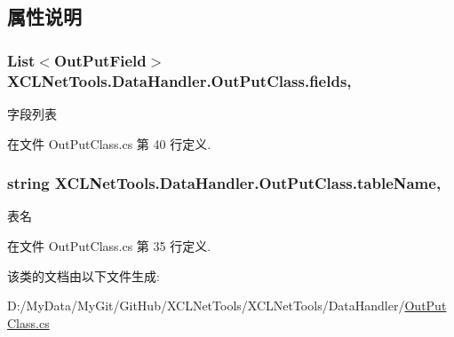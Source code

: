 \subsection{属性说明}
\hypertarget{class_x_c_l_net_tools_1_1_data_handler_1_1_out_put_class_aaa38718d249736e2070ab87f10a829ae}{
\subsubsection[{fields}]{\setlength{\rightskip}{0pt plus 5cm}List$<${\bf Out\-Put\-Field}$>$ X\-C\-L\-Net\-Tools.\-Data\-Handler.\-Out\-Put\-Class.\-fields\hspace{0.3cm}{\ttfamily [get]}, {\ttfamily [set]}}}\label{class_x_c_l_net_tools_1_1_data_handler_1_1_out_put_class_aaa38718d249736e2070ab87f10a829ae}


字段列表 



在文件 Out\-Put\-Class.\-cs 第 40 行定义.

\hypertarget{class_x_c_l_net_tools_1_1_data_handler_1_1_out_put_class_aef1df865588230b66b506058970e8894}{
\subsubsection[{table\-Name}]{\setlength{\rightskip}{0pt plus 5cm}string X\-C\-L\-Net\-Tools.\-Data\-Handler.\-Out\-Put\-Class.\-table\-Name\hspace{0.3cm}{\ttfamily [get]}, {\ttfamily [set]}}}\label{class_x_c_l_net_tools_1_1_data_handler_1_1_out_put_class_aef1df865588230b66b506058970e8894}


表名 



在文件 Out\-Put\-Class.\-cs 第 35 行定义.



该类的文档由以下文件生成\-:\begin{DoxyCompactItemize}
\item 
D\-:/\-My\-Data/\-My\-Git/\-Git\-Hub/\-X\-C\-L\-Net\-Tools/\-X\-C\-L\-Net\-Tools/\-Data\-Handler/\hyperlink{_out_put_class_8cs}{Out\-Put\-Class.\-cs}\end{DoxyCompactItemize}
